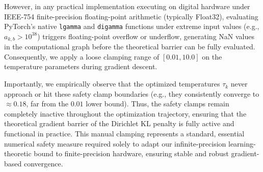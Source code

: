 However, in any practical implementation executing on digital hardware under IEEE-754 finite-precision floating-point arithmetic (typically Float32), evaluating PyTorch's native \texttt{lgamma} and \texttt{digamma} functions under extreme input values (e.g., $a_{k, b} > 10^{38}$) triggers floating-point overflow or underflow, generating NaN values in the computational graph before the theoretical barrier can be fully evaluated. Consequently, we apply a loose clamping range of $[0.01, 10.0]$ on the temperature parameters during gradient descent. 

Importantly, we empirically observe that the optimized temperatures $\tau_k$ never approach or hit these safety clamp boundaries (e.g., they consistently converge to $\approx 0.18$, far from the $0.01$ lower bound). Thus, the safety clamps remain completely inactive throughout the optimization trajectory, ensuring that the theoretical gradient barrier of the Dirichlet KL penalty is fully active and functional in practice. This manual clamping represents a standard, essential numerical safety measure required solely to adapt our infinite-precision learning-theoretic bound to finite-precision hardware, ensuring stable and robust gradient-based convergence.
